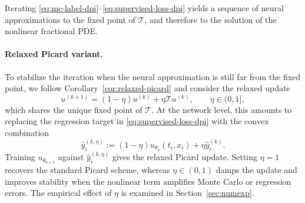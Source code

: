 \documentclass[a4paper,fleqn]{cas-sc}
\begin{document}
Iterating \eqref{eq:mc-label-dpi}--\eqref{eq:supervised-loss-dpi} yields a
sequence of neural approximations to the fixed point of $\mathcal{T}$, and
therefore to the solution of the nonlinear fractional PDE.

\paragraph{Relaxed Picard variant.}
To stabilize the iteration when the neural approximation is still far from the
fixed point, we follow Corollary~\ref{cor:relaxed-picard} and consider the
relaxed update
\begin{equation}\label{eq:relaxed-picard-dpi}
u^{(k+1)}
=
(1-\eta)u^{(k)}+\eta\mathcal{T}u^{(k)},
\qquad \eta\in(0,1],
\end{equation}
which shares the unique fixed point of $\mathcal{T}$. At the network level,
this amounts to replacing the regression target in
\eqref{eq:supervised-loss-dpi} with the convex combination
\begin{equation}\label{eq:relaxed-mc-label}
\widehat{y}_i^{(k,\eta)}
:=
(1-\eta)u_{\theta_k}(t_i,x_i)
+
\eta\widehat{y}_i^{(k)}.
\end{equation}
Training $u_{\theta_{k+1}}$ against $\widehat{y}_i^{(k,\eta)}$ gives the
relaxed Picard update. Setting $\eta=1$ recovers the standard Picard scheme,
whereas $\eta\in(0,1)$ damps the update and improves stability when the
nonlinear term amplifies Monte Carlo or regression errors. The empirical effect
of $\eta$ is examined in Section~\ref{sec:numexp}.
\end{document}
